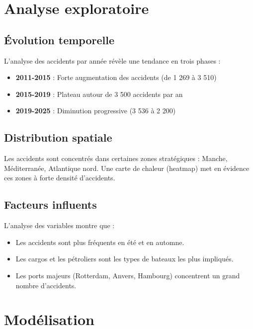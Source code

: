\documentclass[12pt, a4paper]{report}
\begin{document}
\chapter{Analyse exploratoire}

\section{Évolution temporelle}

L'analyse des accidents par année révèle une tendance en trois phases :

\begin{itemize}
    \item \textbf{2011-2015} : Forte augmentation des accidents (de 1 269 à 3 510)
    \item \textbf{2015-2019} : Plateau autour de 3 500 accidents par an
    \item \textbf{2019-2025} : Diminution progressive (3 536 à 2 200)
\end{itemize}

\section{Distribution spatiale}

Les accidents sont concentrés dans certaines zones stratégiques : Manche, Méditerranée, Atlantique nord. Une carte de chaleur (heatmap) met en évidence ces zones à forte densité d'accidents.

\section{Facteurs influents}

L'analyse des variables montre que :

\begin{itemize}
    \item Les accidents sont plus fréquents en été et en automne.
    \item Les cargos et les pétroliers sont les types de bateaux les plus impliqués.
    \item Les ports majeurs (Rotterdam, Anvers, Hambourg) concentrent un grand nombre d'accidents.
\end{itemize}

\chapter{Modélisation}
\end{document}
